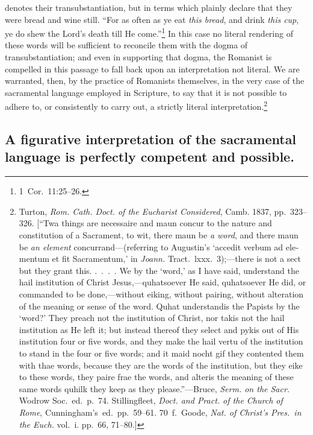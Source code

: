 \documentclass[
  english,
]{book}
\providecommand{\textlatin}{}
\renewcommand{\textlatin}[2][]{\foreignlanguage{latin}{#2}}
\begin{document}
denotes their transubstantiation, but in terms which plainly declare that they were bread and wine still. ``For as often as ye eat \emph{this bread}, and drink \emph{this cup}, ye do shew the Lord's death till He come.''\footnote{1~Cor.~11:25--26.} In this case no literal rendering of these words will be sufficient to reconcile them with the dogma of transubstantiation; and even in supporting that dogma, the Romanist is compelled in this passage to fall back upon an interpretation not literal. We are warranted, then, by the practice of Romanists themselves, in the very case of the sacramental language employed in Scripture, to say that it is not possible to adhere to, or consistently to carry out, a strictly literal interpretation.\footnote{Turton, \emph{Rom. Cath. Doct. of the Eucharist Considered}, Camb. 1837, pp.~323--326. {[}``Twa things are necessaire and maun concur to the nature and constitution of a Sacrament, to wit, there maun be \emph{a word}, and there maun be \emph{an element} concurrand---(referring to Augustin's `\textlatin{accedit verbum ad elementum et fit Sacramentum},' in \emph{Joann.} Tract.~lxxx.~3);---there is not a sect but they grant this. .~.~.~. We by the `word,' as I have said, understand the hail institution of Christ Jesus,---quhatsoever He said, quhatsoever He did, or commanded to be done,---without eiking, without pairing, without alteration of the meaning or sense of the word. Quhat understandis the Papists by the `word?' They preach not the institution of Christ, nor takis not the hail institution as He left it; but instead thereof they select and pykis out of His institution four or five words, and they make the hail vertu of the institution to stand in the four or five words; and it maid nocht gif they contented them with thae words, because they are the words of the institution, but they eike to these words, they paire frae the words, and alteris the meaning of these same words quhilk they keep as they please.''---Bruce, \emph{Serm. on the Sacr.} Wodrow Soc.~ed.~p.~74. Stillingfleet, \emph{Doct. and Pract. of the Church of Rome}, Cunningham's~ed.~pp.~59--61. 70~f.~Goode, \emph{Nat. of Christ's Pres.~in the Euch.} vol.~i. pp.~66, 71--80.{]}}

\hypertarget{a-figurative-interpretation-of-the-sacramental-language-is-perfectly-competent-and-possible.}{%
\subsection{A figurative interpretation of the sacramental language is perfectly competent and possible.}\label{a-figurative-interpretation-of-the-sacramental-language-is-perfectly-competent-and-possible.}}
\end{document}
